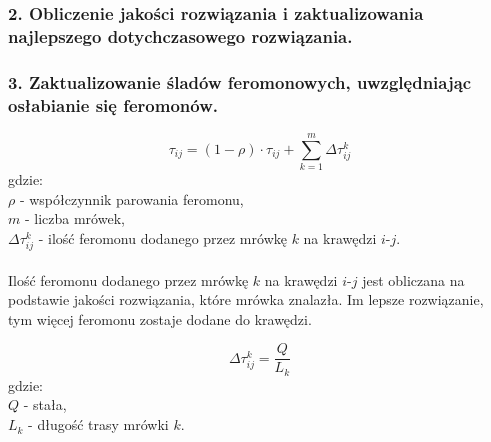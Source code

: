 \documentclass{article}
\begin{document}
\subsubsection*{2. Obliczenie jakości rozwiązania i zaktualizowania najlepszego dotychczasowego rozwiązania.}

\subsubsection*{3. Zaktualizowanie śladów feromonowych, uwzględniając osłabianie się feromonów.}

\begin{equation}
    \tau_{ij} = (1 - \rho) \cdot \tau_{ij} + \sum_{k=1}^{m} \Delta\tau_{ij}^k
\end{equation}
gdzie:
\\
$\rho$ - współczynnik parowania feromonu, 
\\
$m$ - liczba mrówek, 
\\
$\Delta\tau_{ij}^k$ - ilość feromonu dodanego przez mrówkę $k$ na krawędzi $i$-$j$.
\\ \\
Ilość feromonu dodanego przez mrówkę $k$ na krawędzi $i$-$j$ jest obliczana na podstawie jakości rozwiązania, które mrówka znalazła. Im lepsze rozwiązanie, tym więcej feromonu zostaje dodane do krawędzi.

\begin{equation}
    \Delta\tau_{ij}^k = \frac{Q}{L_k}
\end{equation}
gdzie:
\\
$Q$ - stała,
\\
$L_k$ - długość trasy mrówki $k$.
\end{document}
